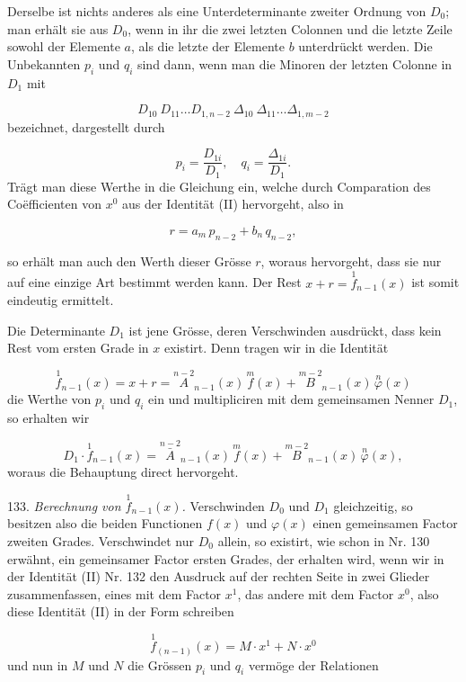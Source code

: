 \documentclass[11pt]{article}
\providecommand{\weberpage}[1]{}
\providecommand{\weq}[2]{\begin{equation}\tag{#1}#2\end{equation}}
\let\Delta\varDelta
\begin{document}
Derselbe ist nichts anderes als eine Unterdeterminante zweiter Ordnung von $D_0$; man erhält sie aus $D_0$, wenn in ihr die zwei letzten Colonnen und die letzte Zeile sowohl der Elemente $a$, als die letzte der Elemente $b$ unterdrückt werden. Die Unbekannten $p_i$ und $q_i$ sind dann, wenn man die Minoren der letzten Colonne in $D_1$ mit

\[
D_{10}\ D_{11} \ldots D_{1,n-2}\ \Delta_{10}\ \Delta_{11} \ldots \Delta_{1,m-2}
\]
bezeichnet, dargestellt durch

\[
p_i = \frac{D_{1i}}{D_1},\quad q_i = \frac{\Delta_{1i}}{D_1}.
\]
Trägt man diese Werthe in die Gleichung ein, welche durch Comparation des Co\"efficienten von $x^0$ aus der Identität (II) hervorgeht, also in

\weq{3}{r = a_m\,p_{n-2} + b_n\,q_{n-2},}

so erhält man auch den Werth dieser Grösse $r$, woraus hervorgeht, dass sie nur auf eine einzige Art bestimmt werden kann. Der Rest $x + r = \overset{1}{f}_{n-1}(x)$ ist somit eindeutig ermittelt.


\weberpage{141}

Die Determinante $D_1$ ist jene Grösse, deren Verschwinden ausdrückt, dass kein Rest vom ersten Grade in $x$ existirt. Denn tragen wir in die Identität

\[
\overset{1}{f}_{n-1}(x) = x + r = \overset{n-2}{A}_{n-1}(x)\,\overset{m}{f}(x) + \overset{m-2}{B}_{n-1}(x)\,\overset{n}{\varphi}(x)
\]
die Werthe von $p_i$ und $q_i$ ein und multipliciren mit dem gemeinsamen Nenner $D_1$, so erhalten wir

\[
D_1 \cdot \overset{1}{f}_{n-1}(x) = \overset{n-2}{\bar A}_{n-1}(x)\,\overset{m}{f}(x) + \overset{m-2}{B}_{n-1}(x)\,\overset{n}{\varphi}(x),
\]
woraus die Behauptung direct hervorgeht.

133. \textit{Berechnung von $\overset{1}{f}_{n-1}(x)$.} Verschwinden $D_0$ und $D_1$ gleichzeitig, so besitzen also die beiden Functionen $f(x)$ und $\varphi(x)$ einen gemeinsamen Factor zweiten Grades. Verschwindet nur $D_0$ allein, so existirt, wie schon in Nr. 130 erwähnt, ein gemeinsamer Factor ersten Grades, der erhalten wird, wenn wir in der Identität (II) Nr. 132 den Ausdruck auf der rechten Seite in zwei Glieder zusammenfassen, eines mit dem Factor $x^1$, das andere mit dem Factor $x^0$, also diese Identität (II) in der Form schreiben

\[
\overset{1}{f}_{(n-1)}(x) = M \cdot x^1 + N \cdot x^0
\]
und nun in $M$ und $N$ die Grössen $p_i$ und $q_i$ vermöge der Relationen
\end{document}
